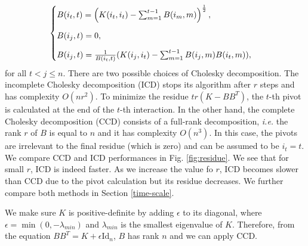 \begin{align}
\begin{cases}
\vspace{3 mm}
B(i_t, t) = \left(K(i_t,i_t)-\sum_{m=1}^{t-1} B(i_{m},m)  \right)^{\frac{1}{2}},\\
\vspace{3 mm}
B(i_j,t) = 0,\\
B(i_j, t) = \frac{1}{B(i_t,t)}(K(i_j,i_t)  -\sum_{m=1}^{t-1}B(i_j,m)B(i_t,m)), \end{cases}\label{icd:algo}
\end{align}
for all $t<j\le n$. There are two possible choices of Cholesky decomposition. The incomplete Cholesky decomposition (ICD) stops its algorithm after $r$ steps and has complexity $O(nr^2)$. 
To minimize the residue $tr(K-BB^T)$, the $t$-th pivot is calculated at the end of the $t$-th interaction. 
In the other hand, the complete Cholesky decomposition (CCD) consists of a full-rank decomposition, \textit{i.e.} the rank $r$ of $B$ is equal to $n$ and it has complexity $O(n^3)$. 
In this case, the pivots are irrelevant to the final residue (which is zero) and can be assumed to be $i_t=t$. %
We compare CCD and ICD performances in Fig. \ref{fig:residue}. We see that for small $r$, ICD is indeed faster. As we increase the value fo $r$, ICD becomes slower than CCD due to the pivot calculation but its residue decreases. We further compare both methods in Section \ref{time-scale}.

We make sure $K$ is positive-definite by adding $\epsilon$ to its diagonal, where $\epsilon=\min(0,-\lambda_{min})$ and $\lambda_{min}$ is the smallest eigenvalue of $K$. Therefore, from the equation $BB^T=K+\epsilon\mathrm{Id}_n$, $B$ has rank $n$ and we can apply CCD.

